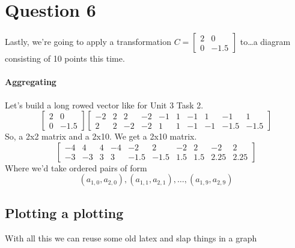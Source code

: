 \documentclass{article}
\begin{document}
    \section{Question 6}
        Lastly, we're going to apply a transformation 
        $C=\begin{bmatrix}2&0\\0&-1.5\end{bmatrix}$
        to\dots a diagram consisting of 10 points this time.
        \paragraph{Aggregating}
            Let's build a long rowed vector like for Unit 3 Task 2.
            \[
                \begin{bmatrix}2&0\\0&-1.5\end{bmatrix}
                \begin{bmatrix}
                    -2&2&2&-2&-1&1&-1&1&-1&1 \\
                    2&2&-2&-2&1&1&-1&-1&-1.5&-1.5
                \end{bmatrix}
            \]
            So, a 2x2 matrix and a 2x10. We get a 2x10 matrix.
            \[
                \begin{bmatrix}
                    -4&4&4&-4&-2&2&-2&2&-2&2 \\
                    -3&-3&3&3&-1.5&-1.5&1.5&1.5&2.25&2.25
                \end{bmatrix}
            \]
            Where we'd take ordered pairs of form
            \[
                (a_{1,0}, a_{2,0}), (a_{1,1}, a_{2,1}), \dots, (a_{1,9}, a_{2,9})
            \]
        \subsection{Plotting a plotting}
                With all this we can reuse some old latex and slap things in a graph
                \begin{center}   
            \end{center}
\end{document}
